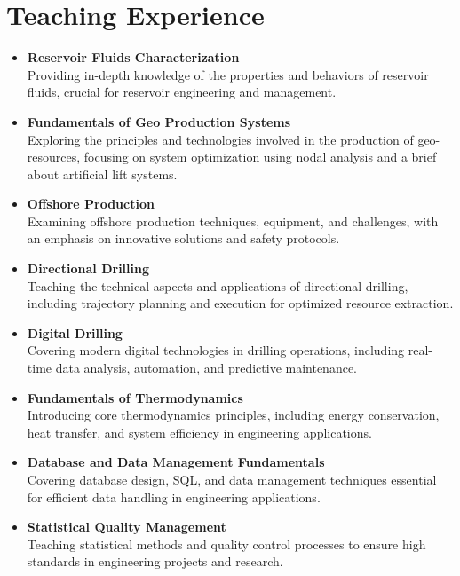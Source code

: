 \documentclass[a4paper,10pt]{article}
\begin{document}
\section*{Teaching Experience}
\begin{itemize}[leftmargin=0.5cm]
    \item \textbf{Reservoir Fluids Characterization} \\
    Providing in-depth knowledge of the properties and behaviors of reservoir fluids, crucial for reservoir engineering and management.

    \item \textbf{Fundamentals of Geo Production Systems} \\
    Exploring the principles and technologies involved in the production of geo-resources, focusing on system optimization using nodal analysis and a brief about artificial lift systems.

    \item \textbf{Offshore Production} \\
    Examining offshore production techniques, equipment, and challenges, with an emphasis on innovative solutions and safety protocols.

    \item \textbf{Directional Drilling} \\
    Teaching the technical aspects and applications of directional drilling, including trajectory planning and execution for optimized resource extraction.
    
    \item \textbf{Digital Drilling} \\
    Covering modern digital technologies in drilling operations, including real-time data analysis, automation, and predictive maintenance.

    \item \textbf{Fundamentals of Thermodynamics} \\
    Introducing core thermodynamics principles, including energy conservation, heat transfer, and system efficiency in engineering applications.

    \item \textbf{Database and Data Management Fundamentals} \\
    Covering database design, SQL, and data management techniques essential for efficient data handling in engineering applications.

    \item \textbf{Statistical Quality Management} \\
    Teaching statistical methods and quality control processes to ensure high standards in engineering projects and research.
\end{itemize}
\end{document}

